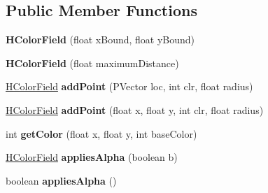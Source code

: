 \subsection*{Public Member Functions}
\begin{DoxyCompactItemize}
\item 
\hypertarget{classhype_1_1colorist_1_1_h_color_field_a4d9aeee6ae7f36dc74dbd6d60783ad2b}{{\bfseries H\-Color\-Field} (float x\-Bound, float y\-Bound)}\label{classhype_1_1colorist_1_1_h_color_field_a4d9aeee6ae7f36dc74dbd6d60783ad2b}

\item 
\hypertarget{classhype_1_1colorist_1_1_h_color_field_a7cf00c369cc444b69a9ba01e81a2cfe2}{{\bfseries H\-Color\-Field} (float maximum\-Distance)}\label{classhype_1_1colorist_1_1_h_color_field_a7cf00c369cc444b69a9ba01e81a2cfe2}

\item 
\hypertarget{classhype_1_1colorist_1_1_h_color_field_aa7420b1c48ee67d00f60221259b435d3}{\hyperlink{classhype_1_1colorist_1_1_h_color_field}{H\-Color\-Field} {\bfseries add\-Point} (P\-Vector loc, int clr, float radius)}\label{classhype_1_1colorist_1_1_h_color_field_aa7420b1c48ee67d00f60221259b435d3}

\item 
\hypertarget{classhype_1_1colorist_1_1_h_color_field_a22631cf70898c465f84c928f93d2d3fd}{\hyperlink{classhype_1_1colorist_1_1_h_color_field}{H\-Color\-Field} {\bfseries add\-Point} (float x, float y, int clr, float radius)}\label{classhype_1_1colorist_1_1_h_color_field_a22631cf70898c465f84c928f93d2d3fd}

\item 
\hypertarget{classhype_1_1colorist_1_1_h_color_field_af067697990b6499242ad756b3e55e253}{int {\bfseries get\-Color} (float x, float y, int base\-Color)}\label{classhype_1_1colorist_1_1_h_color_field_af067697990b6499242ad756b3e55e253}

\item 
\hypertarget{classhype_1_1colorist_1_1_h_color_field_ae86c070c33668ac7ef6094e801c7b0c8}{\hyperlink{classhype_1_1colorist_1_1_h_color_field}{H\-Color\-Field} {\bfseries applies\-Alpha} (boolean b)}\label{classhype_1_1colorist_1_1_h_color_field_ae86c070c33668ac7ef6094e801c7b0c8}

\item 
\hypertarget{classhype_1_1colorist_1_1_h_color_field_ae93ddcc1e07c7921bc5aa249f7af50e9}{boolean {\bfseries applies\-Alpha} ()}\label{classhype_1_1colorist_1_1_h_color_field_ae93ddcc1e07c7921bc5aa249f7af50e9}


\end{DoxyCompactItemize}
